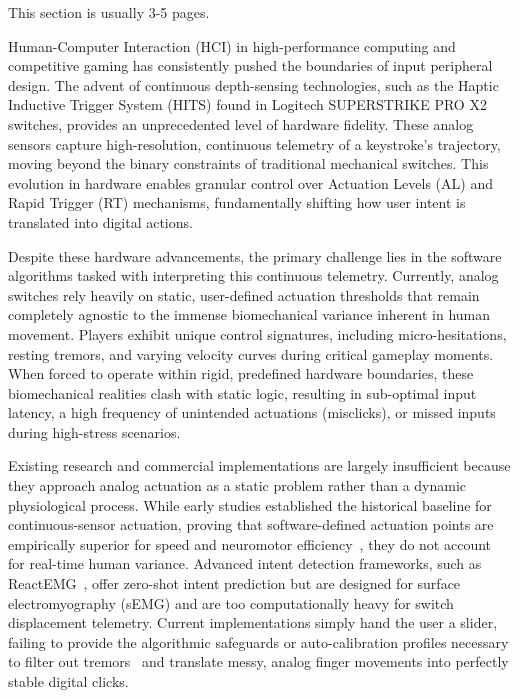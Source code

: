 \documentclass[a4paper,11pt,oneside]{report}
\begin{document}
This section is usually 3-5 pages.

Human-Computer Interaction (HCI) in high-performance computing and competitive gaming has
consistently pushed the boundaries of input peripheral design. The advent of continuous
depth-sensing technologies, such as the Haptic Inductive Trigger System (HITS) found in
Logitech SUPERSTRIKE PRO X2 switches, provides an unprecedented level of hardware fidelity.
These analog sensors capture high-resolution, continuous telemetry of a keystroke's trajectory,
moving beyond the binary constraints of traditional mechanical switches. This evolution in 
hardware enables granular control over Actuation Levels (AL) and Rapid Trigger (RT) mechanisms,
fundamentally shifting how user intent is translated into digital actions.

Despite these hardware advancements, the primary challenge lies in the software algorithms 
tasked with interpreting this continuous telemetry. Currently, analog switches rely heavily 
on static, user-defined actuation thresholds that remain completely agnostic to the immense 
biomechanical variance inherent in human movement. Players exhibit unique control signatures, 
including micro-hesitations, resting tremors, and varying velocity curves during critical 
gameplay moments. When forced to operate within rigid, predefined hardware boundaries, these 
biomechanical realities clash with static logic, resulting in sub-optimal input latency, a high
 frequency of unintended actuations (misclicks), or missed inputs during high-stress scenarios.

Existing research and commercial implementations are largely insufficient because they approach 
analog actuation as a static problem rather than a dynamic physiological process. While early 
studies established the historical baseline for continuous-sensor actuation, proving that 
software-defined actuation points are empirically superior for speed and neuromotor 
efficiency~\cite{touchpad_comparison}, they do not account for real-time human variance. 
Advanced intent detection frameworks, such as ReactEMG~\cite{reactemg}, offer zero-shot intent
prediction but are designed for surface electromyography (sEMG) and are too computationally 
heavy for switch displacement telemetry. Current implementations simply hand the user a slider,
failing to provide the algorithmic safeguards or auto-calibration profiles necessary to filter
out tremors~\cite{dynamic_keyboard} and translate messy, analog finger movements into
perfectly stable digital clicks.
\end{document}
